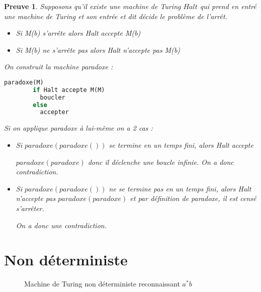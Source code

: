\documentclass{article}
\theoremstyle{plain}
\theoremstyle{nonumberplain}
\newtheorem{prf}{Preuve}
\begin{document}
  \begin{prf}
    Supposons qu'il existe une machine de Turing $Halt$ qui prend 
    en entré une machine de Turing et son entrée et dit décide le problème de l'arrêt.

    \begin{itemize}
      \item Si M(b) s'arrête alors Halt accepte M(b)
      \item Si M(b) ne s'arrête pas alors Halt n'accepte pas M(b)
    \end{itemize}

    On construit la machine paradoxe :
    \begin{lstlisting}[language=Pascal]
      paradoxe(M)
        if Halt accepte M(M)
          boucler
        else 
          accepter
    \end{lstlisting}

    Si on applique paradoxe à lui-même on a 2 cas :
    \begin{itemize}
      \item Si $paradoxe(paradoxe())$ se termine en un temps fini, alors Halt 
        accepte 

        $paradoxe(paradoxe)$ donc il déclenche une boucle infinie. On a donc 
        contradiction.

      \item Si $paradoxe(paradoxe())$ ne se termine pas en un temps fini, alors Halt
        n'accepte pas $paradoxe(paradoxe)$ et par définition de paradoxe, 
        il est censé s'arrêter. 

        On a donc une contradiction.
    \end{itemize}
  \end{prf}

\newpage
\section{Non déterministe}

  \begin{figure}[!htb] 
  \center
    \caption{Machine de Turing non déterministe reconnaissant $a^*b$}
  \end{figure}
\end{document}
